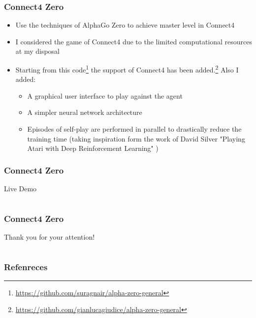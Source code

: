 \documentclass[9pt]{beamer}
\begin{document}
\begin{frame}
	\frametitle{Connect4 Zero}

	\begin{itemize}
		\item Use the techniques of AlphaGo Zero \cite{silver2017mastering} to achieve master level in Connect4
		\item I considered the game of Connect4 due to the limited computational resources at my disposal
		\item Starting from this code\footnote{\url{https://github.com/suragnair/alpha-zero-general}} the support of Connect4 has been added.\footnote{\url{https://github.com/gianlucagiudice/alpha-zero-general}}  Also I added:
		\begin{itemize}
			\item A graphical user interface to play against the agent
			\item A simpler neural network architecture
			\item Episodes of self-play are performed in parallel to drastically reduce the training time (taking inspiration form the work of David Silver "Playing Atari with Deep Reinforcement Learning" \cite{mnih2013atari})

		\end{itemize}

	\end{itemize}

\end{frame}

\begin{frame}
	\frametitle{Connect4 Zero}
	\Huge{\centerline{Live Demo}}
\end{frame}

\section{}
\begin{frame}
	\frametitle{Connect4 Zero}
	\Huge{\centerline{Thank you for your attention!}}
\end{frame}

\section{}
\begin{frame}[allowframebreaks]
	\frametitle{Refenreces}
	\printbibliography
\end{frame}

\end{document}
